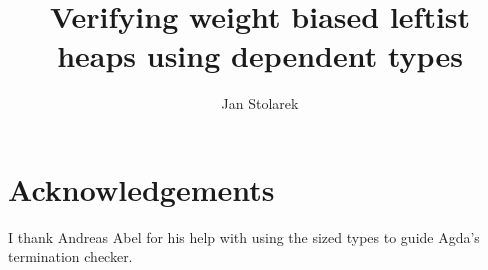 \documentclass[draft]{llncs}
\begin{document}
\title{Verifying weight biased leftist heaps using dependent types}
\author{Jan Stolarek}



\maketitle







\section*{Acknowledgements}

I thank Andreas Abel for his help with using the sized types to guide Agda's termination checker.


\end{document}
